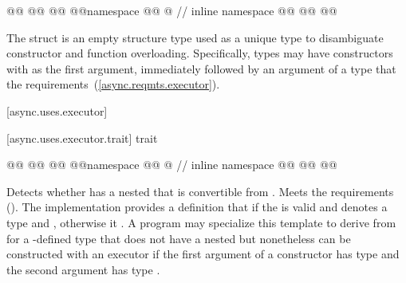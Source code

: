 %
%
\begin{codeblock}
@@
@@
@@
@@namespace @@ @ // inline namespace \namespacever
@@
@@
@@
\end{codeblock}

\pnum
The  struct is an empty structure type used as a unique type to disambiguate constructor and function overloading. Specifically, types may have constructors with  as the first argument, immediately followed by an argument of a type that  the  requirements~(\ref{async.reqmts.executor}).



[async.uses.executor]{}


[async.uses.executor.trait]{ trait}

%
\begin{codeblock}
@@
@@
@@
@@namespace @@ @ // inline namespace \namespacever
@@
@@
@@
\end{codeblock}

\pnum
{} Detects whether  has a nested  that is convertible from . Meets the  requirements (). The implementation provides a definition that   if the   is valid and denotes a type and , otherwise it  . A program may specialize this template to derive from  for a -defined type  that does not have a nested  but nonetheless can be constructed with an executor if the first argument of a constructor has type  and the second argument has type .



